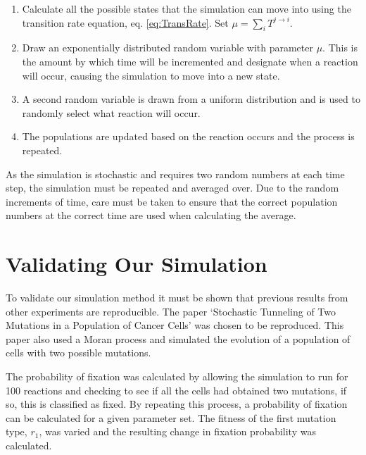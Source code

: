 \documentclass[12pt, a4paper,]{article}
\let\cite=\supercite
\begin{document}

\begin{enumerate}
\item Calculate all the possible states that the simulation can move into using the transition rate equation, eq. \eqref{eq:TransRate}. Set $\mu = \sum _i T^{j \rightarrow i }$.
\item Draw an exponentially distributed random variable with parameter $\mu$. This is the amount by which time will be incremented and designate when a reaction will occur, causing the simulation to move into a new state. 
\item A second random variable is drawn from a uniform distribution and is used to randomly select what reaction will occur. 
\item The populations are updated based on the reaction occurs and the process is repeated.
\end{enumerate}


As the simulation is stochastic and requires two random numbers at each time step, the simulation must be repeated and averaged over. Due to the random increments of time, care must be taken to ensure that the correct population numbers at the correct time are used when calculating the average. 

%

\section{Validating Our Simulation}

To validate our simulation method it must be shown that previous results from other experiments are reproducible. The paper `Stochastic Tunneling of Two Mutations in a Population of Cancer Cells'\cite{haeno_stochastic_2013} was chosen to be reproduced. This paper also used a Moran process and simulated the evolution of a population of cells with two possible mutations.

The probability of fixation was calculated by allowing the simulation to run for 100 reactions  and checking to see if all the cells had obtained two mutations, if so, this is classified as fixed. By repeating this process, a probability of fixation can be calculated for a given parameter set. The fitness of the first mutation type, $r_1$, was varied and the resulting change in fixation probability was calculated. 
\end{document}
